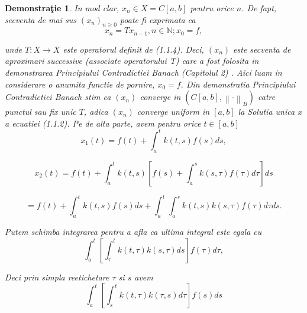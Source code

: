 \documentclass[a4paper,12pt,oneside]{report}
\newtheorem{demonstration}{Demonstra\c tie}
\begin{document}
\begin{demonstration}
	In mod clar, \(x_{n} \in X = C\left [ a,b \right ]\) pentru orice \(n\). De fapt, secventa de mai sus \(\left ( x_{n} \right )_{n\geq 0}\) poate fi exprimata ca 
	\begin{displaymath}
		x_{n} = Tx_{n-1}, n\in \mathbb{N}; x_{0} = f,
	\end{displaymath}
					
	unde \(T : X \rightarrow X\) este operatorul definit de (1.1.4). Deci, \(\left (x_{n}  \right )\) este secventa de aproximari successive (associate operatorului T) care a fost folosita in demonstrarea Principiului Contradictiei Banach (Capitolul 2) . Aici luam in considerare o anumita functie de pornire, \(x_{0} = f\). Din demonstratia Principiului Contradictiei Banach stim ca \(\left ( x_{n} \right )\) converge in \(\left ( C\left [ a,b \right ], \left \| \cdot  \right \|_{B} \right )\) catre punctul sau fix unic \(T\), adica \(\left ( x_{n} \right )\) converge uniform in \(\left [ a,b \right ]\) la Solutia unica \(x\) a ecuatiei (1.1.2). Pe de alta parte, avem pentru orice \(t\in \left [ a,b \right ]\)
	\begin{displaymath}
		x_{1}\left ( t \right ) = f\left ( t \right ) + \int_{a}^{t}k\left ( t,s \right )f\left ( s \right )ds,
	\end{displaymath}
					
	\begin{displaymath}
		x_{2}\left ( t \right ) = f\left ( t \right ) + \int_{a}^{t}k\left ( t,s \right )\left [ f\left ( s \right ) + \int_{a}^{s} k\left ( s,  \tau  \right )f\left (\tau  \right )d\tau  \right ]ds
	\end{displaymath}
					
	\begin{displaymath}
		=  f\left ( t \right ) + \int_{a}^{t}k\left ( t,s \right )f\left ( s \right )ds + \int_{a}^{t}\int_{a}^{s}k\left ( t,s \right )k\left ( s,\tau  \right )f\left (\tau  \right ) d\tau ds.
	\end{displaymath}
					 
	Putem schimba integrarea pentru a afla ca ultima integral este egala cu 
	\begin{displaymath}
		\int_{a}^{t}\left [ \int_{\tau }^{t}k\left ( t,\tau  \right )k\left ( s,\tau  \right )ds \right ]f\left (\tau   \right )d\tau, 
	\end{displaymath}
					
	Deci prin simpla reetichetare \(\tau\) si \(s\) avem 
	\begin{displaymath}
		\int_{a}^{t}\left [ \int_{s}^{t}k\left ( t,\tau  \right )k\left ( \tau ,s \right )d\tau  \right ]f\left ( s \right )ds 
	\end{displaymath}
					

\end{demonstration}
\end{document}
